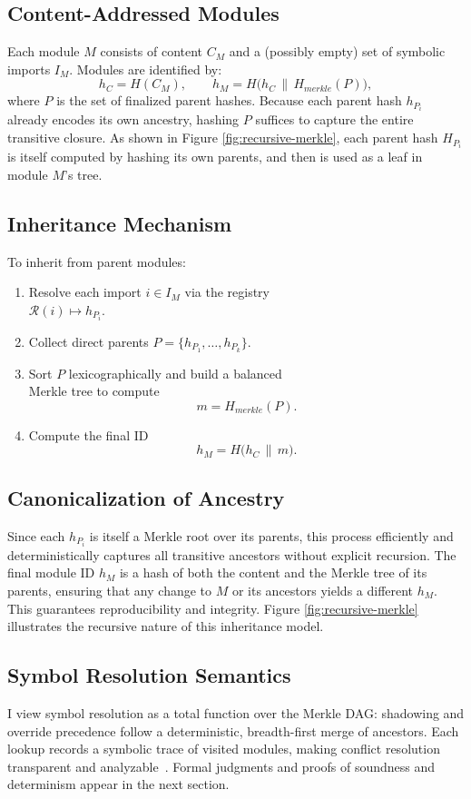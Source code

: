 \documentclass[sigplan,screen]{acmart}
\begin{document}
\subsection{Content-Addressed Modules}
Each module $M$ consists of content $C_M$ and a (possibly empty) set of symbolic imports $I_M$. Modules are identified by:
\[
	h_C = H(C_M),
	\qquad
	h_M = H\bigl(h_C \,\|\, H_{\mathit{merkle}}(P)\bigr),
\]
where $P$ is the set of finalized parent hashes. Because each parent hash $h_{P_i}$ already encodes its own ancestry, hashing $P$ suffices to capture the entire transitive closure. As shown in Figure \ref{fig:recursive-merkle}, each parent hash $H_{P_i}$ is itself computed by hashing its own parents, and then is used as a leaf in module $M$'s tree.

\subsection{Inheritance Mechanism}
To inherit from parent modules:
\begin{enumerate}
	\item Resolve each import $i\in I_M$ via the registry \\$\mathcal{R}(i)\mapsto h_{P_i}$.
	\item Collect direct parents $P = \{h_{P_1},\dots,h_{P_k}\}$.
	\item Sort $P$ lexicographically and build a balanced \\Merkle tree to compute
		\[
			m = H_{\mathit{merkle}}(P).
		\]
	\item Compute the final ID
		\[
			h_M = H\bigl(h_C \,\|\, m\bigr).
		\]
\end{enumerate}

\subsection{Canonicalization of Ancestry}
Since each $h_{P_i}$ is itself a Merkle root over its parents, this process efficiently and deterministically captures all transitive ancestors without explicit recursion. The final module ID $h_M$ is a hash of both the content and the Merkle tree of its parents, ensuring that any change to $M$ or its ancestors yields a different $h_M$. This guarantees reproducibility and integrity. Figure \ref{fig:recursive-merkle} illustrates the recursive nature of this inheritance model.

\subsection{Symbol Resolution Semantics}
I view symbol resolution as a total function over the Merkle DAG: shadowing and override precedence follow a deterministic, breadth-first merge of ancestors. Each lookup records a symbolic trace of visited modules, making conflict resolution transparent and analyzable~\cite{dreyer2003typesystem,ancona2003foundations}. Formal judgments and proofs of soundness and determinism appear in the next section.
\end{document}
